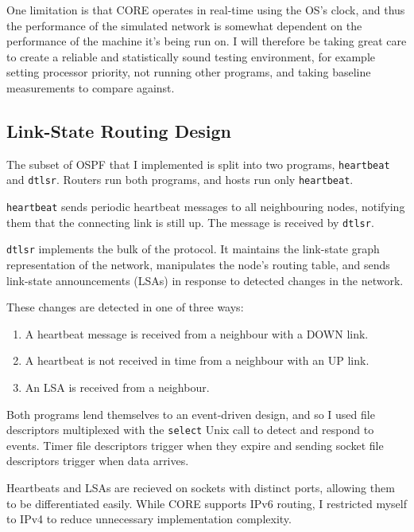 \documentclass[10pt,twoside,a4paper]{article}
\begin{document}
One limitation is that CORE operates in real-time using the OS's clock, and thus the performance of the simulated network is somewhat dependent on the performance of the machine it's being run on. I will therefore be taking great care to create a reliable and statistically sound testing environment, for example setting processor priority, not running other programs, and taking baseline measurements to compare against.

\subsection{Link-State Routing Design}

The subset of OSPF that I implemented is split into two programs, \texttt{heartbeat} and \texttt{dtlsr}. Routers run both programs, and hosts run only \texttt{heartbeat}.

\texttt{heartbeat} sends periodic heartbeat messages to all neighbouring nodes, notifying them that the connecting link is still up. The message is received by \texttt{dtlsr}.

\texttt{dtlsr} implements the bulk of the protocol. It maintains the link-state graph representation of the network, manipulates the node's routing table, and sends link-state announcements (LSAs) in response to detected changes in the network.

These changes are detected in one of three ways:
\begin{enumerate}
	\item
	A heartbeat message is received from a neighbour with a DOWN link.
	
	\item
	A heartbeat is not received in time from a neighbour with an UP link.
	
	\item
	An LSA is received from a neighbour.
\end{enumerate}

Both programs lend themselves to an event-driven design, and so I used file descriptors multiplexed with the \texttt{select} Unix call to detect and respond to events. Timer file descriptors trigger when they expire and sending socket file descriptors trigger when data arrives.

Heartbeats and LSAs are recieved on sockets with distinct ports, allowing them to be differentiated easily. While CORE supports IPv6 routing, I restricted myself to IPv4 to reduce unnecessary implementation complexity.
\end{document}
